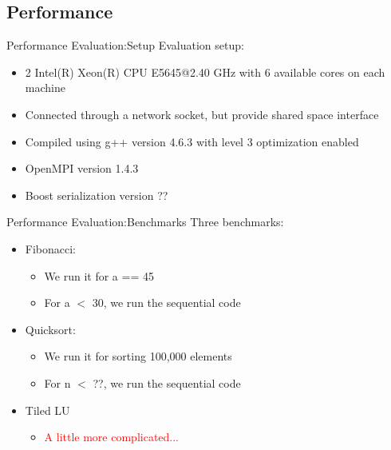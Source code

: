 \documentclass[svgnames]{beamer}
\begin{document}
\subsection{Performance}
\begin{frame}{Performance Evaluation:Setup}
Evaluation setup:
\begin{itemize}
	\item 2 Intel(R) Xeon(R) CPU E5645@2.40 GHz with 6 available cores on each machine
	\item Connected through a network socket, but provide shared space interface
	\item Compiled using g++ version 4.6.3 with level 3 optimization enabled
	\item OpenMPI version 1.4.3
	\item Boost serialization version ??
\end{itemize}
\end{frame}
\begin{frame}{Performance Evaluation:Benchmarks}
Three benchmarks:
\vfill
\begin{itemize}
	\item Fibonacci:
	\begin{itemize}
		\item We run it for a == 45
		\item For a $<$ 30, we run the sequential code
	\end{itemize} 
\vfill
	\item Quicksort:
	\begin{itemize}
		\item We run it for sorting 100,000 elements
		\item For n $<$ ??, we run the sequential code
	\end{itemize}
\vfill
	\item Tiled LU
	\begin{itemize}
		\item<2-> \textcolor{red}{A little more complicated...}
	\end{itemize} 
\end{itemize}
\end{frame}
\end{document}
